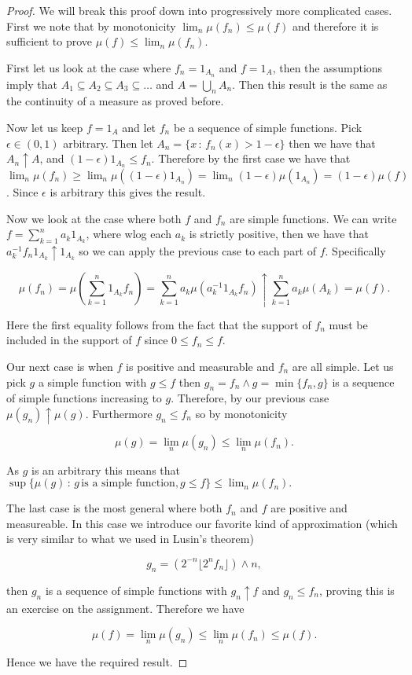 \documentclass[
]{book}
\theoremstyle{definition}
\theoremstyle{definition}
\theoremstyle{definition}
\theoremstyle{definition}
\theoremstyle{remark}
\begin{document}
\begin{proof}
We will break this proof down into progressively more complicated cases. First we note that by monotonicity \(\lim_n \mu(f_n) \leq \mu(f)\) and therefore it is sufficient to prove \(\mu(f) \leq \lim_n \mu(f_n)\).

First let us look at the case where \(f_n = 1_{A_n}\) and \(f=1_{A}\), then the assumptions imply that \(A_1 \subseteq A_2 \subseteq A_3 \subseteq \dots\) and \(A= \bigcup_n A_n\). Then this result is the same as the continuity of a measure as proved before.

Now let us keep \(f=1_{A}\) and let \(f_n\) be a sequence of simple functions. Pick \(\epsilon \in (0,1)\) arbitrary. Then let \(A_n = \{ x\,:\, f_n(x)>1-\epsilon\}\) then we have that \(A_n \uparrow A\), and \((1-\epsilon)1_{A_n} \leq f_n\). Therefore by the first case we have that \(\lim_n \mu(f_n) \geq \lim_n \mu((1-\epsilon)1_{A_n}) = \lim_n (1-\epsilon) \mu(1_{A_n}) = (1-\epsilon) \mu(f)\). Since \(\epsilon\) is arbitrary this gives the result.

Now we look at the case where both \(f\) and \(f_n\) are simple functions. We can write \(f = \sum_{k=1}^n a_k 1_{A_k}\), where wlog each \(a_k\) is strictly positive, then we have that \(a_k^{-1} f_n 1_{A_k} \uparrow 1_{A_k}\) so we can apply the previous case to each part of \(f\). Specifically

\[ \mu(f_n) = \mu(\sum_{k=1}^n  1_{A_k}f_n) = \sum_{k=1}^n a_k \mu (a_k^{-1} 1_{A_k}f_n) \uparrow \sum_{k=1}^n a_k \mu(A_k) = \mu(f). \]

Here the first equality follows from the fact that the support of \(f_n\) must be included in the support of \(f\) since \(0 \leq f_n \leq f\).

Our next case is when \(f\) is positive and measurable and \(f_n\) are all simple. Let us pick \(g\) a simple function with \(g \leq f\) then \(g_n = f_n \wedge g = \min\{f_n, g\}\) is a sequence of simple functions increasing to \(g\). Therefore, by our previous case \(\mu(g_n) \uparrow \mu(g)\). Furthermore \(g_n \leq f_n\) so by monotonicity

\[\mu(g) =\lim_n \mu(g_n) \leq \lim_n \mu(f_n).\]

As \(g\) is an arbitrary this means that \(\sup\{\mu(g)\,:\, g \, \mbox{is a simple function}, g \leq f\} \leq \lim_n \mu(f_n).\)

The last case is the most general where both \(f_n\) and \(f\) are positive and measureable. In this case we introduce our favorite kind of approximation (which is very similar to what we used in Lusin's theorem)

\[ g_n = \left( 2^{-n} \lfloor 2^n f_n \rfloor \right) \wedge n, \]

then \(g_n\) is a sequence of simple functions with \(g_n \uparrow f\) and \(g_n \leq f_n\), proving this is an exercise on the assignment. Therefore we have

\[ \mu(f) = \lim_n \mu(g_n) \leq \lim_n \mu(f_n) \leq \mu(f). \]

Hence we have the required result.
\end{proof}
\end{document}
